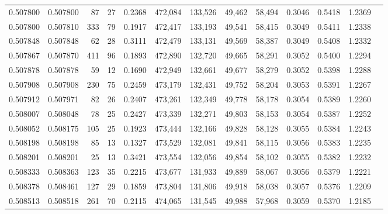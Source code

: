 \begin{tabular}{rrrrrrrrrrrrr}
0.507800 & 0.507800 &    87 &    27 &                                     0.2368 & 472,084 & 133,526 &  49,462 &  58,494 & 0.3046 & 0.5418 & 1.2369 \\
0.507800 & 0.507810 &   333 &    79 &                                     0.1917 & 472,417 & 133,193 &  49,541 &  58,415 & 0.3049 & 0.5411 & 1.2338 \\
0.507848 & 0.507848 &    62 &    28 &                                     0.3111 & 472,479 & 133,131 &  49,569 &  58,387 & 0.3049 & 0.5408 & 1.2332 \\
0.507867 & 0.507870 &   411 &    96 &                                     0.1893 & 472,890 & 132,720 &  49,665 &  58,291 & 0.3052 & 0.5400 & 1.2294 \\
0.507878 & 0.507878 &    59 &    12 &                                     0.1690 & 472,949 & 132,661 &  49,677 &  58,279 & 0.3052 & 0.5398 & 1.2288 \\
0.507908 & 0.507908 &   230 &    75 &                                     0.2459 & 473,179 & 132,431 &  49,752 &  58,204 & 0.3053 & 0.5391 & 1.2267 \\
0.507912 & 0.507971 &    82 &    26 &                                     0.2407 & 473,261 & 132,349 &  49,778 &  58,178 & 0.3054 & 0.5389 & 1.2260 \\
0.508007 & 0.508048 &    78 &    25 &                                     0.2427 & 473,339 & 132,271 &  49,803 &  58,153 & 0.3054 & 0.5387 & 1.2252 \\
0.508052 & 0.508175 &   105 &    25 &                                     0.1923 & 473,444 & 132,166 &  49,828 &  58,128 & 0.3055 & 0.5384 & 1.2243 \\
0.508198 & 0.508198 &    85 &    13 &                                     0.1327 & 473,529 & 132,081 &  49,841 &  58,115 & 0.3056 & 0.5383 & 1.2235 \\
0.508201 & 0.508201 &    25 &    13 &                                     0.3421 & 473,554 & 132,056 &  49,854 &  58,102 & 0.3055 & 0.5382 & 1.2232 \\
0.508333 & 0.508363 &   123 &    35 &                                     0.2215 & 473,677 & 131,933 &  49,889 &  58,067 & 0.3056 & 0.5379 & 1.2221 \\
0.508378 & 0.508461 &   127 &    29 &                                     0.1859 & 473,804 & 131,806 &  49,918 &  58,038 & 0.3057 & 0.5376 & 1.2209 \\
0.508513 & 0.508518 &   261 &    70 &                                     0.2115 & 474,065 & 131,545 &  49,988 &  57,968 & 0.3059 & 0.5370 & 1.2185 \\

\end{tabular}
